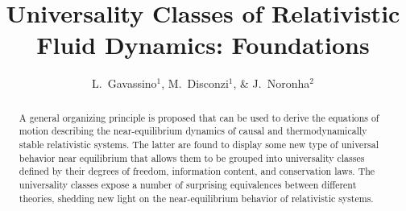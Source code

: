 \documentclass[aps,prl,singlecolumn,nofootinbib]{revtex4-2}
\theoremstyle{definition}
\theoremstyle{theorem}
\begin{document}
\title{Universality Classes of Relativistic Fluid Dynamics: Foundations}
\author{L.~Gavassino$^1$, M.~Disconzi$^{1}$, \& J.~Noronha$^2$}


\begin{abstract}
A general organizing principle is proposed that can be used to derive the equations of motion describing the near-equilibrium dynamics of causal and thermodynamically stable relativistic systems. The latter are found to display some new type of universal behavior near equilibrium that allows them to be grouped into universality classes defined by their degrees of freedom, information content, and conservation laws. The universality classes expose a number of surprising equivalences between different theories, shedding new light on the near-equilibrium behavior of relativistic systems. 
\end{abstract} 
%
%
%
%
\maketitle
\end{document}
